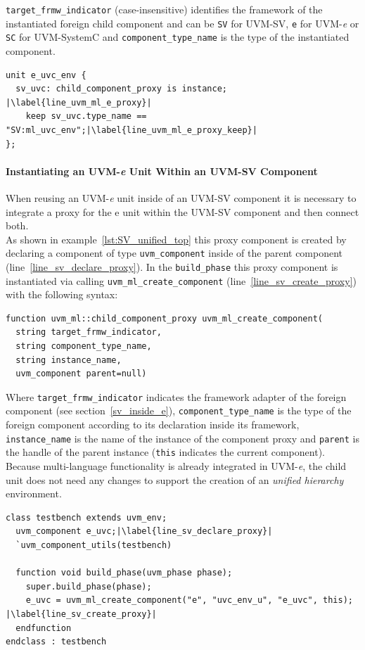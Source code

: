 \lstinline$target_frmw_indicator$ (case-insensitive) identifies the framework
of the instantiated foreign child component and can be \lstinline$SV$ for
UVM-SV, \lstinline$e$ for UVM-\textit{e} or \lstinline$SC$ for UVM-SystemC and
\lstinline$component_type_name$ is the type of the instantiated component.
\medskip
\lstset{language=e, numbers=left, escapechar=|}
\begin{lstlisting}[frame=htrbl, caption={\textit{e}: instantiating the UVM-SV component in the UVM-\textit{e} unit},
label={lst:e_unified_top}]
unit e_uvc_env {
  sv_uvc: child_component_proxy is instance;	|\label{line_uvm_ml_e_proxy}|
    keep sv_uvc.type_name == "SV:ml_uvc_env";|\label{line_uvm_ml_e_proxy_keep}| 
};
\end{lstlisting}

\paragraph{Instantiating an UVM-\textit{e} Unit Within an UVM-SV Component}
When reusing an UVM-\textit{e} unit inside of an UVM-SV component it is
necessary to integrate a proxy for the e unit within the UVM-SV
component and then connect both.\\
As shown in example~\ref{lst:SV_unified_top} this proxy component is created by
declaring a component of type \lstinline$uvm_component$ inside of the parent
component (line~\ref{line_sv_declare_proxy}). In the \lstinline$build_phase$ this proxy component is
instantiated via calling \lstinline$uvm_ml_create_component$ (line~\ref{line_sv_create_proxy}) with the following
syntax:
\medskip
{}
\begin{lstlisting}
function uvm_ml::child_component_proxy uvm_ml_create_component(
  string target_frmw_indicator,
  string component_type_name,
  string instance_name,
  uvm_component parent=null)
\end{lstlisting} 
\medskip
Where \lstinline$target_frmw_indicator$ indicates the framework adapter of the
foreign component (see section~\ref{sv_inside_e}),
\lstinline$component_type_name$ is the type of the foreign component according
to its declaration inside its framework, \lstinline$instance_name$ is the name
of the instance of the component proxy and \lstinline$parent$ is the handle of
the parent instance (\lstinline$this$ indicates the current component).\\
Because multi-language functionality is already integrated in UVM-\textit{e}, the child unit does not need any changes
to support the creation of an \emph{unified hierarchy} environment.
\medskip
\lstset{language=SystemVerilog, numbers = left, escapechar=|, breaklines=true}
\begin{lstlisting}[frame=htrbl, caption={SystemVerilog: instantiating an e unit}, label={lst:SV_unified_top}]
class testbench extends uvm_env;
  uvm_component e_uvc;|\label{line_sv_declare_proxy}|
  `uvm_component_utils(testbench)

  function void build_phase(uvm_phase phase);
    super.build_phase(phase);
    e_uvc = uvm_ml_create_component("e", "uvc_env_u", "e_uvc", this); |\label{line_sv_create_proxy}|
  endfunction
endclass : testbench
\end{lstlisting}

